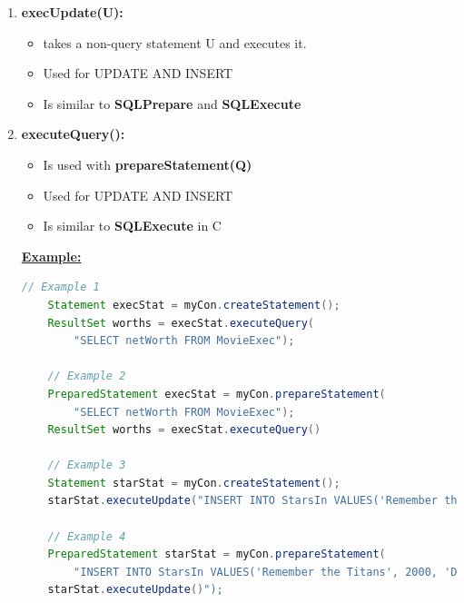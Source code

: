 \documentclass[12pt]{article}
\begin{document}
\begin{enumerate}[1.]
\begin{enumerate}[a)]
\begin{itemize}
\begin{itemize}
\begin{enumerate}[1.]
\begin{itemize}
                    \end{itemize}
                    \item \textbf{execUpdate(U):}
                    \begin{itemize}
                        \item takes a non-query statement U and executes it.
                        \item Used for UPDATE AND INSERT
                        \item Is similar to \textbf{SQLPrepare} and \textbf{SQLExecute}
                    \end{itemize}
                    \item \textbf{executeQuery():}
                    \begin{itemize}
                        \item Is used with \textbf{prepareStatement(Q)}
                        \item Used for UPDATE AND INSERT
                        \item Is similar to \textbf{SQLExecute} in C
                    \end{itemize}

                    \bigskip

                    \underline{\textbf{Example:}}

                    \bigskip

    \begin{lstlisting}[language=JAVA]
    // Example 1
    Statement execStat = myCon.createStatement();
    ResultSet worths = execStat.executeQuery(
        "SELECT netWorth FROM MovieExec");

    // Example 2
    PreparedStatement execStat = myCon.prepareStatement(
        "SELECT netWorth FROM MovieExec");
    ResultSet worths = execStat.executeQuery()

    // Example 3
    Statement starStat = myCon.createStatement();
    starStat.executeUpdate("INSERT INTO StarsIn VALUES('Remember the Titans', 2000, 'Denzel Washington')");

    // Example 4
    PreparedStatement starStat = myCon.prepareStatement(
        "INSERT INTO StarsIn VALUES('Remember the Titans', 2000, 'Denzel Washington')");
    starStat.executeUpdate()");
    \end{lstlisting}

                    \bigskip


\end{enumerate}
\end{itemize}
\end{itemize}
\end{enumerate}
\end{enumerate}
\end{document}
